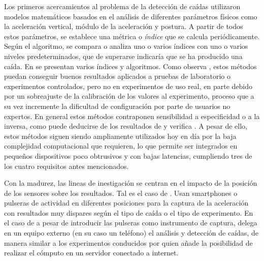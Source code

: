 Los primeros acercamientos\cite{Williams1998,fallindex00,Chen2005,Kangas2008} al problema de la detección de caídas utilizaron modelos matemáticos basados en el análisis de diferentes parámetros físicos como la aceleración vertical, módulo de la aceleración y postura. A partir de todos estos parámetros, se establece una métrica o \textit{índice} que se calcula periódicamente. Según el algoritmo, se compara o analiza uno o varios índices con uno o varios niveles predeterminados, que de superarse indicaría que se ha producido una caída\cite{Luque2014}. En  se presentan varios índices y algoritmos. Como observa , estos métodos puedan conseguir buenos resultados aplicados a pruebas de laboratorio o experimentos controlados, pero no en experimentos de uso real, en parte debido por un sobreajuste de la calibración de los valores al experimento, proceso que a su vez incremente la dificultad de configuración por parte de usuarios no expertos\cite{Kangas2008, Luque2014}. En general estos métodos contraponen sensibilidad a especificidad o a la inversa, como puede deducirse de los resultados de  y verifica . A pesar de ello, estos métodos siguen siendo ampliamente utilizados hoy en día por la baja complejidad computacional que requieren, lo que permite ser integrados en pequeños dispositivos poco obtrusivos y con bajas latencias, cumpliendo tres de los cuatro requisitos antes mencionados.

Con la madurez, las lineas de inestigación se centran en el impacto de la posición de los sensores sobre los resultados. Tal es el caso de . Usan smartphones o pulseras de actividad en diferentes posiciones para la captura de la aceleración con resultados muy dispares según el tipo de caída o el tipo de experimento. En el caso de  a pesar de introducir las pulseras como instrumento de captura, delega en un equipo externo (en su caso un teléfono) el análisis y detección de caídas, de manera similar a los experimentos conducidos por \cite{Luque2014} quien añade la posibilidad de realizar el cómputo en un servidor conectado a internet.

